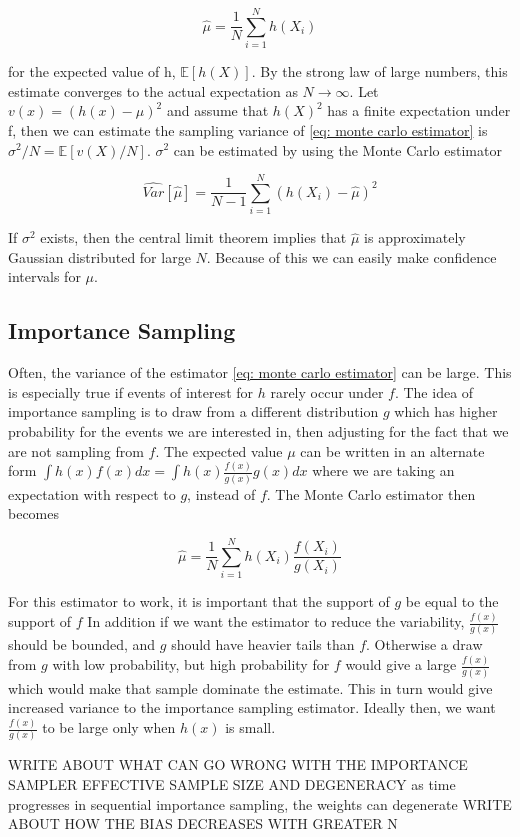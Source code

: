 \begin{equation}
\hat{\mu} = \frac{1}{N} \sum_{i=1}^N h(X_i)
\label{eq: monte carlo estimator}    
\end{equation}
  
for the expected value of h, $\mathbb{E}[h(X)]$. By the strong law of large numbers, this estimate converges to the actual expectation as $N\rightarrow\infty$. Let $v(x) = (h(x) - {\mu})^2$ and assume that $h(X)^2$ has a finite expectation under f, then we can estimate the sampling variance of \eqref{eq: monte carlo estimator} is $\sigma^2/N = \mathbb{E}[v(X)/N]$. $\sigma^2$ can be estimated by using the Monte Carlo estimator

\begin{equation}
    \widehat{Var}[\hat{\mu}] = \frac{1}{N-1}\sum_{i=1}^N (h(X_i) - \hat{\mu})^2
\end{equation}

If $\sigma^2$ exists, then the central limit theorem implies that $\hat{\mu}$ is approximately Gaussian distributed for large $N$. Because of this we can easily make confidence intervals for $\mu$.


\subsection{Importance Sampling}
\label{subsec: importance sampling theory}
Often, the variance of the estimator \eqref{eq: monte carlo estimator} can be large. This is especially true if events of interest for $h$ rarely occur under $f$. The idea of importance sampling is to draw from a different distribution $g$ which has higher probability for the events we are interested in, then adjusting for the fact that we are not sampling from $f$. The expected value $\mu$ can be written in an alternate form $\int h(x)f(x)dx = \int h(x)\frac{f(x)}{g(x)}g(x) dx$ where we are taking an expectation with respect to $g$, instead of $f$. The Monte Carlo estimator then becomes

\begin{equation}
    \hat{\mu} = \frac{1}{N} \sum_{i=1}^N h(X_i)\frac{f(X_i)}{g(X_i)}
\end{equation}

For this estimator to work, it is important that the support of $g$ be equal to the support of $f$
In addition if we want the estimator to reduce the variability, $\frac{f(x)}{g(x)}$ should be bounded, and $g$ should have heavier tails than $f$. Otherwise a draw from $g$ with low probability, but high probability for $f$ would give a large $\frac{f(x)}{g(x)}$ which would make that sample dominate the estimate. This in turn would give increased variance to the importance sampling estimator. Ideally then,  we want $\frac{f(x)}{g(x)}$ to be large only when $h(x)$ is small. \parencite{givens2013computational}






WRITE ABOUT WHAT CAN GO WRONG WITH THE IMPORTANCE SAMPLER
EFFECTIVE SAMPLE SIZE AND DEGENERACY
as time progresses in sequential importance sampling, the weights can degenerate
WRITE ABOUT HOW THE BIAS DECREASES WITH GREATER N

